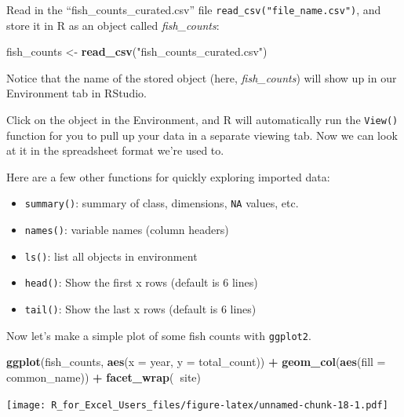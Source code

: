 \documentclass[]{book}
\newenvironment{Shaded}{\begin{snugshade}}{\end{snugshade}}
\newcommand{\DataTypeTok}[1]{\textcolor[rgb]{0.13,0.29,0.53}{#1}}
\newcommand{\KeywordTok}[1]{\textcolor[rgb]{0.13,0.29,0.53}{\textbf{#1}}}
\newcommand{\NormalTok}[1]{#1}
\newcommand{\OperatorTok}[1]{\textcolor[rgb]{0.81,0.36,0.00}{\textbf{#1}}}
\newcommand{\StringTok}[1]{\textcolor[rgb]{0.31,0.60,0.02}{#1}}
\providecommand{\tightlist}{%
  \setlength{\itemsep}{0pt}\setlength{\parskip}{0pt}}
\begin{document}
Read in the ``fish\_counts\_curated.csv'' file \texttt{read\_csv("file\_name.csv")}, and store it in R as an object called \emph{fish\_counts}:

\begin{Shaded}
\begin{Highlighting}[]
\NormalTok{fish_counts <-}\StringTok{ }\KeywordTok{read_csv}\NormalTok{(}\StringTok{"fish_counts_curated.csv"}\NormalTok{)}
\end{Highlighting}
\end{Shaded}

Notice that the name of the stored object (here, \emph{fish\_counts}) will show up in our Environment tab in RStudio.

Click on the object in the Environment, and R will automatically run the \texttt{View()} function for you to pull up your data in a separate viewing tab. Now we can look at it in the spreadsheet format we're used to.

Here are a few other functions for quickly exploring imported data:

\begin{itemize}
\tightlist
\item
  \texttt{summary()}: summary of class, dimensions, \texttt{NA} values, etc.
\item
  \texttt{names()}: variable names (column headers)
\item
  \texttt{ls()}: list all objects in environment
\item
  \texttt{head()}: Show the first x rows (default is 6 lines)
\item
  \texttt{tail()}: Show the last x rows (default is 6 lines)
\end{itemize}

Now let's make a simple plot of some fish counts with \texttt{ggplot2}.

\begin{Shaded}
\begin{Highlighting}[]
\KeywordTok{ggplot}\NormalTok{(fish_counts, }\KeywordTok{aes}\NormalTok{(}\DataTypeTok{x =}\NormalTok{ year, }\DataTypeTok{y =}\NormalTok{ total_count)) }\OperatorTok{+}
\StringTok{  }\KeywordTok{geom_col}\NormalTok{(}\KeywordTok{aes}\NormalTok{(}\DataTypeTok{fill =}\NormalTok{ common_name)) }\OperatorTok{+}
\StringTok{  }\KeywordTok{facet_wrap}\NormalTok{(}\OperatorTok{~}\NormalTok{site)}
\end{Highlighting}
\end{Shaded}

\texttt{[image: R\_for\_Excel\_Users\_files/figure-latex/unnamed-chunk-18-1.pdf]}
\end{document}
